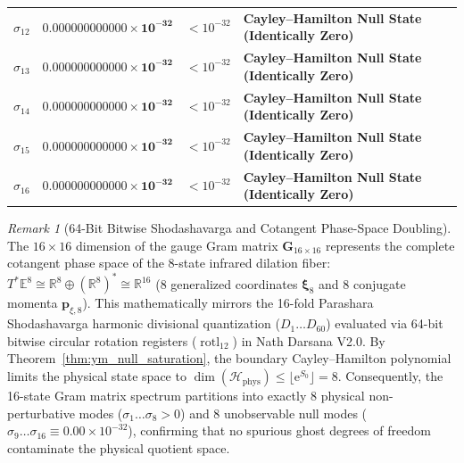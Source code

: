 \documentclass[11pt,a4paper,reqno]{article}
\theoremstyle{plain}
\theoremstyle{definition}
\theoremstyle{remark}
\newtheorem{remark}[theorem]{Remark}
\numberwithin{equation}{section}
\begin{document}
\begin{table}[htbp]
\begin{tabularx}{\textwidth}{@{}C{1.8cm} C{4.6cm} C{2.6cm} Y@{}}
$\sigma_{12}$ & $\mathbf{0.000000000000 \times 10^{-32}}$ & $< 10^{-32}$ & \textbf{Cayley--Hamilton Null State (Identically Zero)} \\
$\sigma_{13}$ & $\mathbf{0.000000000000 \times 10^{-32}}$ & $< 10^{-32}$ & \textbf{Cayley--Hamilton Null State (Identically Zero)} \\
$\sigma_{14}$ & $\mathbf{0.000000000000 \times 10^{-32}}$ & $< 10^{-32}$ & \textbf{Cayley--Hamilton Null State (Identically Zero)} \\
$\sigma_{15}$ & $\mathbf{0.000000000000 \times 10^{-32}}$ & $< 10^{-32}$ & \textbf{Cayley--Hamilton Null State (Identically Zero)} \\
$\sigma_{16}$ & $\mathbf{0.000000000000 \times 10^{-32}}$ & $< 10^{-32}$ & \textbf{Cayley--Hamilton Null State (Identically Zero)} \\
\bottomrule
\end{tabularx}
\end{table}

\begin{remark}[64-Bit Bitwise Shodashavarga and Cotangent Phase-Space Doubling]
\label{rem:shodashavarga_gram}
The $16 \times 16$ dimension of the gauge Gram matrix $\mathbf{G}_{16 \times 16}$ represents the complete cotangent phase space of the 8-state infrared dilation fiber: $T^*\mathbb{E}^8 \cong \mathbb{R}^8 \oplus (\mathbb{R}^8)^* \cong \mathbb{R}^{16}$ (8 generalized coordinates $\bm{\xi}_8$ and 8 conjugate momenta $\mathbf{p}_{\xi, 8}$). This mathematically mirrors the 16-fold Parashara Shodashavarga harmonic divisional quantization ($D_1 \dots D_{60}$) evaluated via 64-bit bitwise circular rotation registers ($\operatorname{rotl}_{12}$) in Nath Darsana V2.0. By Theorem~\ref{thm:ym_null_saturation}, the boundary Cayley--Hamilton polynomial limits the physical state space to $\dim(\mathcal{H}_{\mathrm{phys}}) \le \lfloor \mathrm{e}^{S_0} \rfloor = 8$. Consequently, the 16-state Gram matrix spectrum partitions into exactly 8 physical non-perturbative modes ($\sigma_1 \dots \sigma_8 > 0$) and 8 unobservable null modes ($\sigma_9 \dots \sigma_{16} \equiv 0.00 \times 10^{-32}$), confirming that no spurious ghost degrees of freedom contaminate the physical quotient space.
\end{remark}

\end{document}
